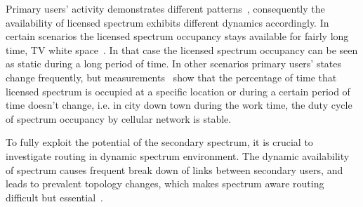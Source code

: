 Primary users' activity demonstrates different patterns~\cite{commag-Khalife08}, consequently the availability of licensed spectrum exhibits different dynamics accordingly.
In certain scenarios the licensed spectrum occupancy stays available for fairly long time, \eg TV white space~\cite{SenseLess2011}.
In that case the licensed spectrum occupancy can be seen as static during a long period of time.
In other scenarios primary users' states change frequently, but measurements~\cite{Wellens200910, measurement_Palaios14} show that the percentage of time that licensed spectrum is occupied at a specific location or during a certain period of time doesn’t change, i.e. in city down town during the work time, the duty cycle of spectrum occupancy by cellular network is stable.

To fully exploit the potential of the secondary spectrum, it is crucial to investigate routing in dynamic spectrum environment.
The dynamic availability of spectrum causes frequent break down of links between secondary users, and leads to prevalent topology changes, which makes spectrum aware routing difficult but essential~\cite{routing_CRN_challenges_solutions_2011}.


